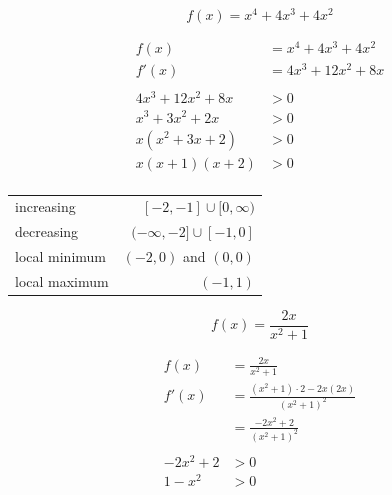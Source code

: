 \documentclass[fleqn,addpoints]{exam}
\begin{document}
\begin{questions}


\ifprintanswers
\else
\pagebreak
\fi


\question[5]
\label{local_min_max:first}
\[
  f(x) = x^4 + 4x^3 + 4x^2
\]

\begin{solution}[7 cm]
\begin{align*}
  f(x) &= x^4 + 4x^3 + 4x^2 \\
  f'(x) &= 4x^3 + 12x^2 + 8x \\
\\
  4x^3 + 12x^2 + 8x &> 0 \\
  x^3 + 3x^2 + 2x &> 0 \\
  x(x^2 + 3x + 2) &> 0 \\
  x(x + 1)(x+2) &> 0 \\
\end{align*}

\begin{tabular}{lr}
\toprule
increasing     & $[-2, -1] \cup [0, \infty)$ \\
decreasing     & $(-\infty, -2] \cup [-1, 0]$ \\
local minimum  & $(-2, 0)$ and $(0, 0)$\\
local maximum  & $(-1, 1)$ \\
\bottomrule
\end{tabular}

\end{solution}

\ifprintanswers
\pagebreak
\fi

\question[7]
\label{local_min_max:last}
\[
  f(x) = \frac{2x}{x^2 + 1}
\]

\begin{solution}[6 cm]
\begin{align*}
  f(x) &= \frac{2x}{x^2 + 1} \\
  f'(x) &= \frac{(x^2 + 1) \cdot 2 - 2x (2x)}{(x^2 + 1)^2} \\
        &= \frac{-2x^2 + 2}{(x^2 + 1)^2} \\
\\
  -2x^2 + 2 &> 0 \\
  1 - x^2 &> 0 \\
\end{align*}


\end{solution}
\end{questions}
\end{document}
